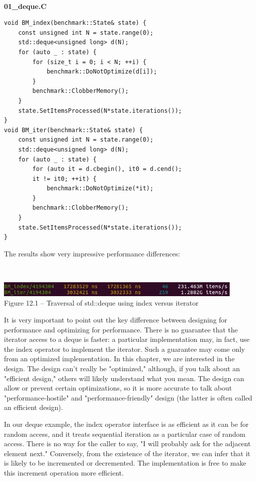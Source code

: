 \hspace*{\fill} \\ %
\noindent
\textbf{01\_deque.C}
\begin{lstlisting}[style=styleCXX]
void BM_index(benchmark::State& state) {
	const unsigned int N = state.range(0);
	std::deque<unsigned long> d(N);
	for (auto _ : state) {
		for (size_t i = 0; i < N; ++i) {
			benchmark::DoNotOptimize(d[i]);
		}
		benchmark::ClobberMemory();
	}
	state.SetItemsProcessed(N*state.iterations());
}
void BM_iter(benchmark::State& state) {
	const unsigned int N = state.range(0);
	std::deque<unsigned long> d(N);
	for (auto _ : state) {
		for (auto it = d.cbegin(), it0 = d.cend(); 
		it != it0; ++it) {
			benchmark::DoNotOptimize(*it);
		}
		benchmark::ClobberMemory();
	}
	state.SetItemsProcessed(N*state.iterations());
}
\end{lstlisting}

The results show very impressive performance differences:

\hspace*{\fill} \\ %
\begin{center}
\includegraphics[width=0.9\textwidth]{content/3/chapter12/images/1.jpg}\\
Figure 12.1 – Traversal of std::deque using index versus iterator
\end{center}

It is very important to point out the key difference between designing for performance and optimizing for performance. There is no guarantee that the iterator access to a deque is faster: a particular implementation may, in fact, use the index operator to implement the iterator. Such a guarantee may come only from an optimized implementation. In this chapter, we are interested in the design. The design can't really be "optimized," although, if you talk about an "efficient design," others will likely understand what you mean. The design can allow or prevent certain optimizations, so it is more accurate to talk about "performance-hostile" and "performance-friendly" design (the latter is often called an efficient design). 

In our deque example, the index operator interface is as efficient as it can be for random access, and it treats sequential iteration as a particular case of random access. There is no way for the caller to say, "I will probably ask for the adjacent element next." Conversely, from the existence of the iterator, we can infer that it is likely to be incremented or decremented. The implementation is free to make this increment operation more efficient.

